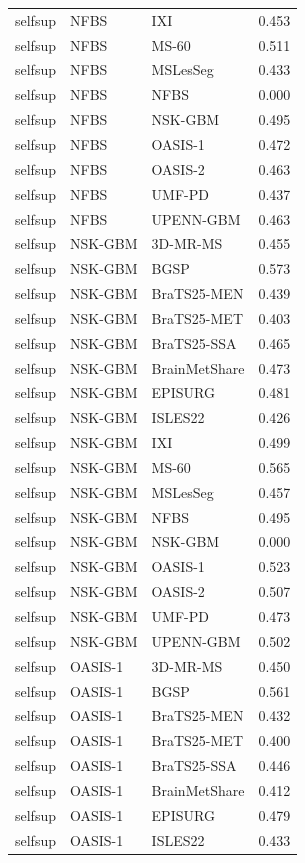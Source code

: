 \begin{tabular}{lllr}
selfsup & NFBS & IXI & 0.453 \\
selfsup & NFBS & MS-60 & 0.511 \\
selfsup & NFBS & MSLesSeg & 0.433 \\
selfsup & NFBS & NFBS & 0.000 \\
selfsup & NFBS & NSK-GBM & 0.495 \\
selfsup & NFBS & OASIS-1 & 0.472 \\
selfsup & NFBS & OASIS-2 & 0.463 \\
selfsup & NFBS & UMF-PD & 0.437 \\
selfsup & NFBS & UPENN-GBM & 0.463 \\
selfsup & NSK-GBM & 3D-MR-MS & 0.455 \\
selfsup & NSK-GBM & BGSP & 0.573 \\
selfsup & NSK-GBM & BraTS25-MEN & 0.439 \\
selfsup & NSK-GBM & BraTS25-MET & 0.403 \\
selfsup & NSK-GBM & BraTS25-SSA & 0.465 \\
selfsup & NSK-GBM & BrainMetShare & 0.473 \\
selfsup & NSK-GBM & EPISURG & 0.481 \\
selfsup & NSK-GBM & ISLES22 & 0.426 \\
selfsup & NSK-GBM & IXI & 0.499 \\
selfsup & NSK-GBM & MS-60 & 0.565 \\
selfsup & NSK-GBM & MSLesSeg & 0.457 \\
selfsup & NSK-GBM & NFBS & 0.495 \\
selfsup & NSK-GBM & NSK-GBM & 0.000 \\
selfsup & NSK-GBM & OASIS-1 & 0.523 \\
selfsup & NSK-GBM & OASIS-2 & 0.507 \\
selfsup & NSK-GBM & UMF-PD & 0.473 \\
selfsup & NSK-GBM & UPENN-GBM & 0.502 \\
selfsup & OASIS-1 & 3D-MR-MS & 0.450 \\
selfsup & OASIS-1 & BGSP & 0.561 \\
selfsup & OASIS-1 & BraTS25-MEN & 0.432 \\
selfsup & OASIS-1 & BraTS25-MET & 0.400 \\
selfsup & OASIS-1 & BraTS25-SSA & 0.446 \\
selfsup & OASIS-1 & BrainMetShare & 0.412 \\
selfsup & OASIS-1 & EPISURG & 0.479 \\
selfsup & OASIS-1 & ISLES22 & 0.433 \\

\end{tabular}
